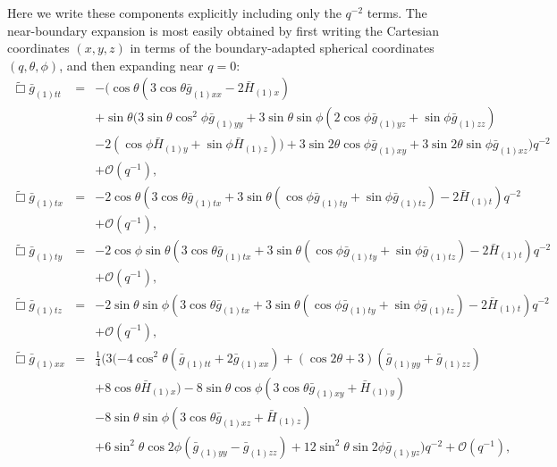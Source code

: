\documentclass[a4paper,11pt]{article}
\numberwithin{equation}{section}
\begin{document}
Here we write these components explicitly including only the $q^{-2}$ terms. 
The near-boundary expansion is most easily obtained by first writing the Cartesian coordinates $(x,y,z)$ in terms of the boundary-adapted spherical coordinates $(q,\theta,\phi)$, and then expanding near $q=0$:
\begin{eqnarray}\label{eqn:efett}
\tilde{\Box}\bar{g}_{(1)tt}&=&-(\cos \theta (3 \cos \theta  \bar{g}_{(1)xx}-2 \bar{H}_{(1)x}) \nonumber \\
&&+\sin\theta (3 \sin \theta \cos^2\phi \bar{g}_{(1) yy}+3
   \sin \theta  \sin \phi (2 \cos \phi  \bar{g}_{(1) yz}+\sin\phi
   \bar{g}_{(1) zz}) \nonumber \\
   &&-2 (\cos \phi \bar{H}_{(1) y}+\sin\phi
   \bar{H}_{(1) z}))+3 \sin 2 \theta  \cos \phi \bar{g}_{(1) xy}+3
   \sin 2 \theta  \sin \phi \bar{g}_{(1) xz})q^{-2} \nonumber \\
&&+\mathcal{O}(q^{-1}),\\
%
\label{eqn:efetx}
\tilde{\Box}\bar{g}_{(1)tx}&=&-2 \cos \theta (3 \cos\theta \bar{g}_{(1) tx}+3 \sin \theta
   (\cos \phi  \bar{g}_{(1) ty}+\sin \phi  \bar{g}_{(1)tz})-2
   \bar{H}_{(1) t})    q^{-2} \nonumber \\
&&+\mathcal{O}(q^{-1}),\\
%
\label{eqn:efety}
\tilde{\Box}\bar{g}_{(1)ty}&=&-2 \cos \phi \sin\theta (3 \cos\theta \bar{g}_{(1) tx}+3 \sin \theta
   (\cos \phi  \bar{g}_{(1) ty}+\sin \phi  \bar{g}_{(1)tz})-2
   \bar{H}_{(1) t})    q^{-2} \nonumber \\
&&+\mathcal{O}(q^{-1}),\\
%
\label{eqn:efetz}
\tilde{\Box}\bar{g}_{(1)tz}&=&-2 \sin \theta \sin\phi (3 \cos\theta \bar{g}_{(1) tx}+3 \sin \theta
   (\cos \phi \bar{g}_{(1) ty}+\sin \phi  \bar{g}_{(1)tz})-2
   \bar{H}_{(1) t})    q^{-2} \nonumber \\
&&+\mathcal{O}(q^{-1}),\\
%
\label{eqn:efexx}
\tilde{\Box}\bar{g}_{(1)xx}&=&\frac{1}{4} (3 (-4 \cos ^2\theta (\bar{g}_{(1) tt}+2 \bar{g}_{(1)
   xx})+(\cos 2 \theta +3) (\bar{g}_{(1) yy}+\bar{g}_{(1)
zz}) \nonumber \\
&&+8 \cos \theta  \bar{H}_{(1) x})-8 \sin \theta  \cos \phi 
   (3 \cos \theta  \bar{g}_{(1)xy}+\bar{H}_{(1) y}) \nonumber \\
   &&-8 \sin\theta \sin\phi (3 \cos\theta \bar{g}_{(1) xz}+\bar{H}_{(1) z}) \nonumber \\
   &&+6 \sin^2\theta  \cos 2 \phi  (\bar{g}_{(1)yy}-\bar{g}_{(1)zz})+12
   \sin^2\theta  \sin 2 \phi  \bar{g}_{(1) yz})    q^{-2} +\mathcal{O}(q^{-1}),\\

\end{eqnarray}
\end{document}
